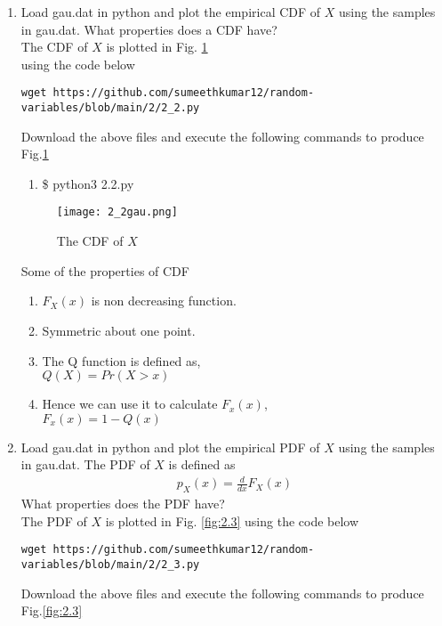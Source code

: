 \documentclass[journal,12pt,twocolumn]{IEEEtran}
\begin{document}
\begin{enumerate}[label=\thesection.\arabic*
,ref=\thesection.\theenumi]
\begin{enumerate}
    \item \$ gcc 2\_1.c
    \item \$ ./a.out
    \end{enumerate}
\item
Load gau.dat in python and plot the empirical CDF of $X$ using the samples in gau.dat. What properties does a CDF have?\\
\solution The CDF of $X$ is plotted in Fig. \ref{fig:2.2}\\
using the code below
\begin{lstlisting}
wget https://github.com/sumeethkumar12/random-variables/blob/main/2/2_2.py
\end{lstlisting}
Download the above files and execute the following commands to produce Fig.\ref{fig:2.2}
\begin{enumerate}
    \item \$ python3 2.2.py
\end{enumerate}
\begin{figure}[!h]
\centering
\texttt{[image: 2\_2gau.png]}
\caption{The CDF of $X$}
\label{fig:2.2}
\end{figure}
Some of the properties of CDF 
\begin{enumerate}
    \item $F_X(x)$ is non decreasing function.
    \item Symmetric about one point.
    \item The Q function is defined as,\\
          $Q(X)=Pr(X>x)$
    \item Hence we can use it to calculate  $F_x(x) $,\\
           $F_x(x)=1-Q(x)$
\end{enumerate}
\item
Load gau.dat in python and plot the empirical PDF of $X$ using the samples in gau.dat. The PDF of $X$ is defined as
\begin{align}
p_{X}(x) = \frac{d}{dx}F_{X}(x)
\end{align}
What properties does the PDF have?
\\
\solution The PDF of $X$ is plotted in Fig. \ref{fig:2.3} using the code below
\begin{lstlisting}
wget https://github.com/sumeethkumar12/random-variables/blob/main/2/2_3.py
\end{lstlisting}
Download the above files and execute the following commands to produce Fig.\ref{fig:2.3}

\end{enumerate}
\end{document}
